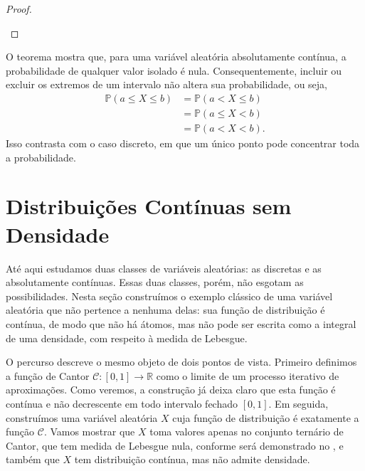 \documentclass[12pt,portuguese]{article}
\theoremstyle{definition}
\theoremstyle{plainexercise}
\theoremstyle{starredexercise}
\theoremstyle{definition}
\begin{document}
\begin{proof}
\begin{center}
  \end{center}
\end{proof}

O teorema mostra que, para uma variável aleatória absolutamente contínua, a
probabilidade de qualquer valor isolado é nula. Consequentemente, incluir ou
excluir os extremos de um intervalo não altera sua probabilidade, ou seja,
\begin{align*}
  \mathbb{P}(a \leqslant X \leqslant b)
  &= \mathbb{P}(a<X \leqslant b)
  \\[0.3cm]
  &= \mathbb{P}(a \leqslant X<b)
  \\[0.3cm]
  &= \mathbb{P}(a<X<b).
\end{align*}
Isso contrasta com o caso discreto, em que um único ponto pode concentrar
toda a probabilidade.


\section{Distribuições Contínuas sem Densidade}
\label{sec:distribuicoes-singulares}

Até aqui estudamos duas classes de variáveis aleatórias: as discretas e as
absolutamente contínuas. Essas duas classes, porém, não esgotam as
possibilidades. Nesta seção construímos o exemplo clássico de uma variável
aleatória que não pertence a nenhuma delas: sua função de distribuição é
contínua, de modo que não há átomos, mas não pode ser escrita como a integral de
uma densidade, com respeito à medida de Lebesgue.

O percurso descreve o mesmo objeto de dois pontos de vista. Primeiro definimos a
função de Cantor $\mathcal{C}:[0,1]\to\mathbb{R}$ como o limite
de um processo iterativo de aproximações. Como veremos, a construção já deixa claro
que esta função é contínua e não decrescente em todo intervalo fechado $[0,1]$. 
Em seguida, construímos uma variável aleatória $X$ cuja função de distribuição é
exatamente a função $\mathcal{C}$. 
Vamos mostrar que $X$ toma valores apenas no conjunto ternário de Cantor, que tem
medida de Lebesgue nula, conforme será demonstrado no
, e também que $X$ tem distribuição contínua,
mas não admite densidade.
\end{document}
